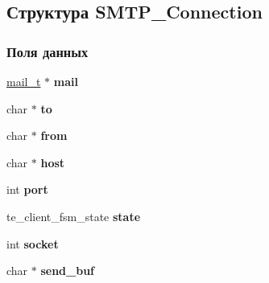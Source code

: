 \hypertarget{structSMTP__Connection}{}\subsection{Структура S\+M\+T\+P\+\_\+\+Connection}
\label{structSMTP__Connection}
\subsubsection*{Поля данных}
\begin{DoxyCompactItemize}
\item 
\hyperlink{structMail}{mail\+\_\+t} $\ast$ {\bfseries mail}\hypertarget{structSMTP__Connection_ae9059787ab20e950f882602f40b033b0}{}\label{structSMTP__Connection_ae9059787ab20e950f882602f40b033b0}

\item 
char $\ast$ {\bfseries to}\hypertarget{structSMTP__Connection_a10ba3cfb7cce3a08b8309dc7d91ae483}{}\label{structSMTP__Connection_a10ba3cfb7cce3a08b8309dc7d91ae483}

\item 
char $\ast$ {\bfseries from}\hypertarget{structSMTP__Connection_aa6cc7059797e49177b16f21aa7e3cf8c}{}\label{structSMTP__Connection_aa6cc7059797e49177b16f21aa7e3cf8c}

\item 
char $\ast$ {\bfseries host}\hypertarget{structSMTP__Connection_aa3a14ff5e9c318f68153cd1a77705fb9}{}\label{structSMTP__Connection_aa3a14ff5e9c318f68153cd1a77705fb9}

\item 
int {\bfseries port}\hypertarget{structSMTP__Connection_a1cf109360cdee2dbd52f125e92c6209f}{}\label{structSMTP__Connection_a1cf109360cdee2dbd52f125e92c6209f}

\item 
te\+\_\+client\+\_\+fsm\+\_\+state {\bfseries state}\hypertarget{structSMTP__Connection_a77b25130f9dca9ed41ad18a2366fc960}{}\label{structSMTP__Connection_a77b25130f9dca9ed41ad18a2366fc960}

\item 
int {\bfseries socket}\hypertarget{structSMTP__Connection_aab57f026810b4814cff7d94bbe408244}{}\label{structSMTP__Connection_aab57f026810b4814cff7d94bbe408244}

\item 
char $\ast$ {\bfseries send\+\_\+buf}\hypertarget{structSMTP__Connection_a24985259506f6deae708d08a6e55c969}{}\label{structSMTP__Connection_a24985259506f6deae708d08a6e55c969}


\end{DoxyCompactItemize}
